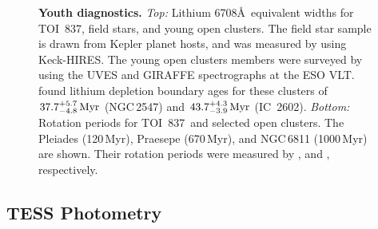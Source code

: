 \documentclass[12pt,twocolumn,tighten]{aastex62}
\newcommand{\tn}{TOI~837} %
\newcommand{\cn}{IC~2602} %
\begin{document}
\begin{figure}[t]
	\begin{center}
		\leavevmode
		
		\vspace{-0.5cm}
	\end{center}
	\vspace{-0.7cm}
	\caption{ {\bf Youth diagnostics.}
    {\it Top:} Lithium 6708\AA\ equivalent widths for \tn, field
    stars, and young open clusters.  The field star sample is drawn
    from Kepler planet hosts, and was measured by
    \citet{berger_identifying_2018} using Keck-HIRES.  The young open
    clusters members were surveyed by \citet{randich_gaiaeso_2018}
    using the UVES and GIRAFFE spectrographs at the ESO VLT.
    \citet{randich_gaiaeso_2018} found lithium depletion boundary ages
    for these clusters of $37.7^{+5.7}_{-4.8}\,{\rm Myr}$
    (NGC$\,$2547) and $43.7^{+4.3}_{-3.9}\,{\rm Myr}$ (\cn).  {\it
    Bottom:} Rotation periods for \tn\ and selected open clusters.
    The Pleiades (120$\,$Myr), Praesepe (670$\,$Myr), and NGC$\,$6811
    (1000$\,$Myr) are shown.  Their rotation periods were measured by
    \citet{rebull_rotation_2016a,douglas_poking_2017,douglas_k2_2019},
    and \citet{curtis_temporary_2019}, respectively.
    \label{fig:lithium_rotation}
	}
\end{figure}





\subsection{TESS Photometry}
\label{subsec:tess}
\end{document}
